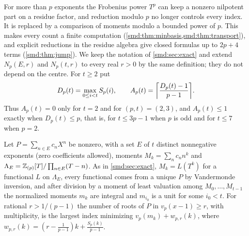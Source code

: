 For more than $p$ exponents the Frobenius power $T^p$ can keep a nonzero nilpotent part on a
residue factor, and reduction modulo $p$ no longer controls every index. It is replaced by a
comparison of moments modulo a bounded power of $p$. This makes every count a finite
computation (\cref{smd:thm:minbasis,smd:thm:transport}), and explicit reductions in the
residue algebra give closed formulas up to $2p+4$ terms (\cref{smd:thm:jump}). We keep the
notation of \cref{smd:sec:exact} and extend $N_p(E,r)$ and $N_p(t,r)$ to every real $r>0$ by
the same definition; they do not depend on the centre. For $t\ge2$ put
\[
 D_p(t)=\max_{0\le i<t}S_p(i),\qquad A_p(t)=\ceil*{\frac{D_p(t)-1}{p-1}} .
\]
Thus $A_p(t)=0$ only for $t=2$ and for $(p,t)=(2,3)$, and $A_p(t)\le1$ exactly when
$D_p(t)\le p$, that is, for $t\le3p-1$ when $p$ is odd and for $t\le7$ when $p=2$.

Let $P=\sum_{n\in E}c_nX^n$ be nonzero, with a set $E$ of $t$ distinct nonnegative exponents
(zero coefficients allowed), moments $M_k=\sum_nc_nn^k$ and
$\Lambda_E=\mathbb{Z}_{(p)}[T]/\prod_{n\in E}(T-n)$. As in \cref{smd:sec:exact}, $M_k=L(T^k)$ for a
functional $L$ on $\Lambda_E$, every functional comes from a unique $P$ by Vandermonde
inversion, and after division by a moment of least valuation among $M_0,\dots,M_{t-1}$ the
normalized moments $m_k$ are integral and $m_{i_0}$ is a unit for some $i_0<t$. For rational
$r>1/(p-1)$ the number of roots of $P$ in $v_p(x-1)\ge r$, with multiplicity, is the largest
index minimizing $v_p(m_k)+w_{p,r}(k)$, where $w_{p,r}(k)=(r-\frac1{p-1})k+\frac{S_p(k)}{p-1}$.


